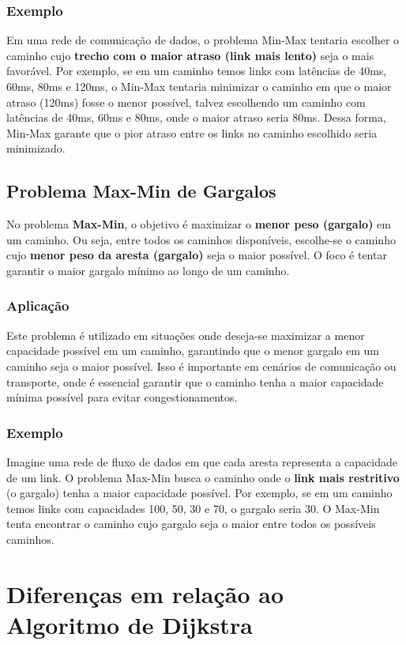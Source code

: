 \documentclass[12pt]{article}
\begin{document}
\subsubsection{Exemplo} Em uma rede de comunicação de dados, o problema Min-Max tentaria escolher o caminho cujo \textbf{trecho com o maior atraso (link mais lento)} seja o mais favorável. Por exemplo, se em um caminho temos links com latências de 40ms, 60ms, 80ms e 120ms, o Min-Max tentaria minimizar o caminho em que o maior atraso (120ms) fosse o menor possível, talvez escolhendo um caminho com latências de 40ms, 60ms e 80ms, onde o maior atraso seria 80ms. Dessa forma, Min-Max garante que o pior atraso entre os links no caminho escolhido seria minimizado.

\subsection{Problema Max-Min de Gargalos}

No problema \textbf{Max-Min}, o objetivo é maximizar o \textbf{menor peso (gargalo)} em um caminho. Ou seja, entre todos os caminhos disponíveis, escolhe-se o caminho cujo \textbf{menor peso da aresta (gargalo)} seja o maior possível. O foco é tentar garantir o maior gargalo mínimo ao longo de um caminho.

\subsubsection{Aplicação}
Este problema é utilizado em situações onde deseja-se maximizar a menor capacidade possível em um caminho, garantindo que o menor gargalo em um caminho seja o maior possível. Isso é importante em cenários de comunicação ou transporte, onde é essencial garantir que o caminho tenha a maior capacidade mínima possível para evitar congestionamentos.

\subsubsection{Exemplo}
Imagine uma rede de fluxo de dados em que cada aresta representa a capacidade de um link. O problema Max-Min busca o caminho onde o \textbf{link mais restritivo} (o gargalo) tenha a maior capacidade possível. Por exemplo, se em um caminho temos links com capacidades 100, 50, 30 e 70, o gargalo seria 30. O Max-Min tenta encontrar o caminho cujo gargalo seja o maior entre todos os possíveis caminhos.

\section{Diferenças em relação ao Algoritmo de Dijkstra}
\end{document}
